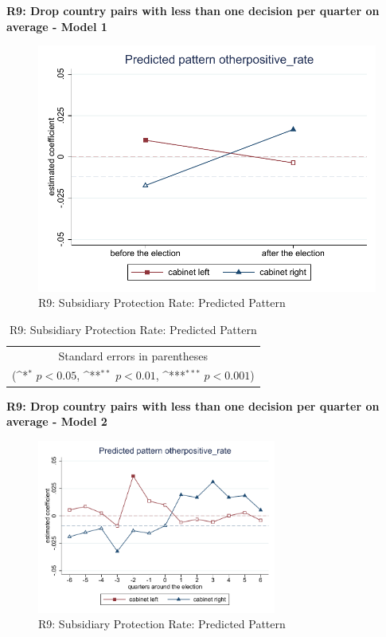 \documentclass[10pt,a4paper]{scrartcl}
\begin{document}
\clearpage
\textbf{R9: Drop country pairs with less than one decision per quarter on average - Model 1}
\begin{figure}[!ht]
	\centering
	\includegraphics[width=1\textwidth]{figures_edited/otherpositive_rate_graph1_R9.pdf}
	\caption{R9: Subsidiary Protection Rate: Predicted Pattern}
\end{figure}

\begin{table}[!ht]\centering
	\renewcommand{\arraystretch}{1.25}
	\def\sym#1{\ifmmode^{#1}\else\(^{#1}\)\fi}
	\caption{R9: Subsidiary Protection Rate: Predicted Pattern}
	\begin{tabular}{l*{2}{c}}
		\hline\hline
		
		\hline\hline
		\multicolumn{3}{c}{\footnotesize Standard errors in parentheses} \\
		\multicolumn{3}{c}{\footnotesize (\sym{*} \(p<0.05\), \sym{**} \(p<0.01\), \sym{***} \(p<0.001\))}\\
	\end{tabular}
\end{table}

\clearpage
\textbf{R9: Drop country pairs with less than one decision per quarter on average - Model 2}
\begin{figure}[!ht]
	\centering
	\includegraphics[width=0.7\textwidth]{figures_edited/otherpositive_rate_graph2_R9.pdf}
	\caption{R9: Subsidiary Protection Rate: Predicted Pattern}
\end{figure}
\end{document}
